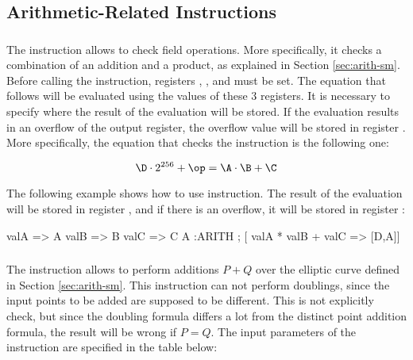 \subsection{Arithmetic-Related Instructions}

\subsubsection{\ARITH}

The \ARITH instruction allows to check field operations. More specifically, it checks a combination of an addition and a product, as explained in Section \ref{sec:arith-sm}. Before calling the \ARITH instruction, registers \A, \B, and \C must be set. The equation that follows will be evaluated using the values of these $3$ registers. It is necessary to specify where the result of the evaluation will be stored. If the evaluation results in an overflow of the output register, the overflow value will be stored in register \D. More specifically, the equation that checks the \ARITH instruction is the following one:

\[
\D \cdot 2^{256} + \op = \A \cdot \B + \C
\]

The following example shows how to use \ARITH instruction. The result of the evaluation will be stored in register \A, and if there is an overflow, it will be stored in register \D:
\begin{zkasm}
valA => A          
valB => B          
valC => C
A            :ARITH ; [ valA * valB + valC => [D,A]]
\end{zkasm}





\subsubsection{\ARITHADDDIFF}

The \ARITHADDDIFF instruction allows to perform additions $P + Q$ over the elliptic curve defined in Section \ref{sec:arith-sm}. This instruction can not perform doublings, since the input points to be added are supposed to be different. This is not explicitly check, but since the doubling formula differs a lot from the distinct point addition formula, the result will be wrong if $P = Q$. The input parameters of the instruction are specified in the table below:

